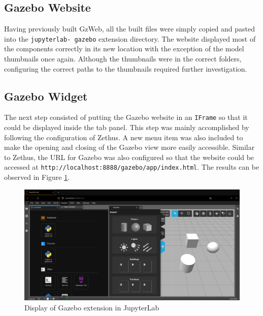 \subsection{Gazebo Website}

    Having previously built GzWeb, all the built files were simply copied and pasted into the \texttt{jupyterlab- gazebo} extension directory. The website displayed most of the components correctly in its new location with the exception of the model thumbnails once again. Although the thumbnails were in the correct folders, configuring the correct paths to the thumbnails required further investigation. 


\subsection{Gazebo Widget}

    The next step consisted of putting the Gazebo website in an \texttt{IFrame} so that it could be displayed inside the tab panel. This step was mainly accomplished by following the configuration of Zethus. A new menu item was also included to make the opening and closing of the Gazebo view more easily accessible. Similar to Zethus, the URL for Gazebo was also configured so that the website could be accessed at \texttt{http://localhost:8888/gazebo/app/index.html}. The results can be observed in Figure \ref{fig:gzTrial2}.

\begin{figure}[h]
    \centering
    \includegraphics[width=\linewidth]{Images/06_gazeboTrial02.png}
    \caption{Display of Gazebo extension in JupyterLab}
    \label{fig:gzTrial2}
\end{figure}

